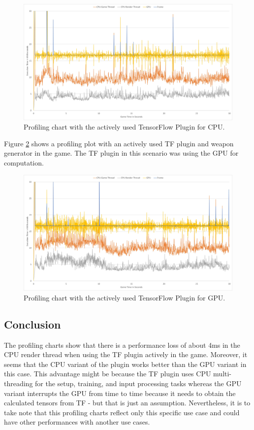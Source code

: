 \documentclass[MGS,Master,english]{twbook}%
\begin{document}
\begin{figure}[!ht]
	\centering
	\includegraphics[width=1.0\linewidth]{PICs/Profiling/tf_cpu}
	\caption{Profiling chart with the actively used TensorFlow Plugin for CPU.} \label{scenario::profiling_CPU}
\end{figure}
Figure \ref{scenario::profiling_GPU} shows a profiling plot with an actively used TF plugin and weapon generator in the game. The TF plugin in this scenario was using the GPU for computation.
\begin{figure}[!ht]
	\centering
	\includegraphics[width=1.0\linewidth]{PICs/Profiling/tf_gpu}
	\caption{Profiling chart with the actively used TensorFlow Plugin for GPU.} \label{scenario::profiling_GPU}
\end{figure}

\subsection{Conclusion}
The profiling charts show that there is a performance loss of about 4ms in the CPU render thread when using the TF plugin actively in the game. Moreover, it seems that the CPU variant of the plugin works better than the GPU variant in this case. This advantage might be because the TF plugin uses CPU multi-threading for the setup, training, and input processing tasks whereas the GPU variant interrupts the GPU from time to time because it needs to obtain the calculated tensors from TF - but that is just an assumption. Nevertheless, it is to take note that this profiling charts reflect only this specific use case and could have other performances with another use cases. 
\end{document}
